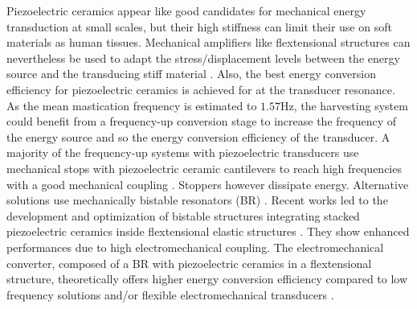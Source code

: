 \documentclass[3p,twocolumn,preprint]{elsarticle}
\begin{document}
Piezoelectric ceramics appear like good candidates for mechanical energy transduction at small scales, but their high stiffness can limit their use on soft materials as human tissues. Mechanical amplifiers like flextensional structures can nevertheless be used to adapt the stress/displacement levels between the energy source and the transducing stiff material \cite{Abdelnaby2016}. Also, the best energy conversion efficiency for piezoelectric ceramics is achieved for at the transducer resonance. As the mean mastication frequency is estimated to \mbox{$1.57$Hz}, the harvesting system could benefit from a frequency-up conversion stage \cite{Ashraf2011,Peng2021} to increase the frequency of the energy source and so the energy conversion efficiency of the transducer. A majority of the frequency-up systems with piezoelectric transducers use mechanical stops with piezoelectric ceramic cantilevers to reach high frequencies with a good mechanical coupling \cite{Edwards2013,Gu2011,Lee2007}. Stoppers however dissipate energy. Alternative solutions use mechanically bistable resonators (BR) \cite{Vocca2012}. Recent works led to the development and optimization of bistable structures integrating stacked piezoelectric ceramics inside flextensional elastic structures \cite{Huguet2017}. They show enhanced performances due to high electromechanical coupling. The electromechanical converter, composed of a BR with piezoelectric ceramics in a flextensional structure, theoretically offers higher energy conversion efficiency compared to low frequency solutions and/or flexible electromechanical transducers \cite{Abdelnaby2016,Peng2021}.
\end{document}
